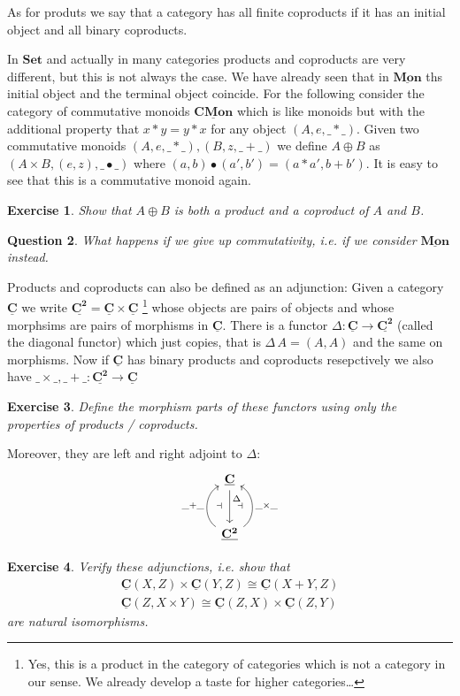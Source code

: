 \documentclass{article}
\newcommand{\Set}{\mathbf{Set}}
\newcommand{\cat}[1]{\underline{\mathbf{#1}}}
\newtheorem{exercise}{Exercise}
\newtheorem{question}[exercise]{Question}
\begin{document}
As for produts we say that a category has all finite coproducts if it has an initial object and all binary coproducts.

In $\Set$ and actually in many categories products and coproducts are very different, but this is not always the case. We have already seen that in $\cat{Mon}$ ths initial object and the terminal object coincide. For the following consider the category of commutative monoids $\cat{CMon}$ which is like monoids but with the additional property that $x * y = y * x$ for any object $(A,e,\_*\_)$. Given two commutative monoids  $(A,e,\_*\_),  (B,z,\_+\_)$ we define $A \oplus B$ as $(A\times B,(e,z),\_ \bullet \_)$ where $(a,b) \bullet (a',b') = (a * a',b + b')$. It is easy to see that this is a commutative monoid again.
\begin{exercise}
Show that $A \oplus B$ is both a product and a coproduct of $A$ and $B$.
\end{exercise}
\begin{question}
  What happens if we give up commutativity, i.e. if we consider $\cat{Mon}$ instead.
\end{question}

Products and coproducts can also be defined as an adjunction: Given a category $\cat{C}$ we write $\cat{C^2} = \cat{C}\times\cat{C}$
\footnote{Yes, this is a product in the category of categories which is not a category in our sense. We already develop a taste for higher categories\dots}
whose objects are pairs of objects and whose morphsims are pairs of morphisms in $\cat{C}$. There is a functor $\Delta : \cat{C} \to \cat{C^2}$ (called the diagonal functor) which just copies, that is $\Delta\,A = (A,A)$ and the same on morphisms. Now if $\cat{C}$ has binary products and coproducts resepctively we also have $\_\times\_, \_+\_ : \cat{C^2} \to \cat{C}$
\begin{exercise}
  Define the morphism parts of these functors using only the properties of products / coproducts.
\end{exercise}
Moreover, they are left and right adjoint to $\Delta$:
\[\begin{tikzcd}[row sep=large]
\cat{C} \arrow[d,"\Delta" near start] \\ 
\cat{C^2} \arrow[u,bend left = 60,"\_+\_" left,"\dashv" right=5 ] \arrow[u,bend right = 60,"\_\times\_" right,"\dashv" left = 5]
\end{tikzcd}\]
\begin{exercise}
  Verify these adjunctions, i.e. show that
  \begin{align*}
    \cat{C}(X,Z) \times \cat{C}(Y,Z) \cong \cat{C}(X + Y,Z) \\
    \cat{C}(Z, X\times Y) \cong \cat{C}(Z,X) \times \cat{C}(Z,Y)
  \end{align*}
  are natural isomorphisms. 
\end{exercise}
\end{document}
